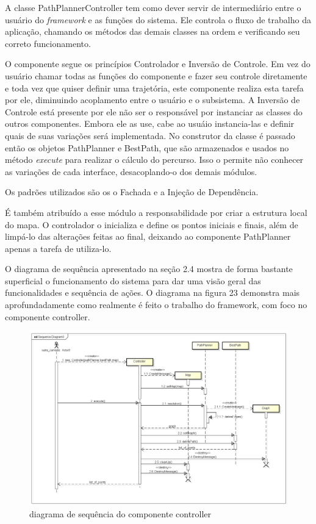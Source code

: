 A classe PathPlannerController tem como dever servir de intermediário entre o usuário do \textit{framework} e as funções do sistema. Ele controla o fluxo de trabalho da aplicação, chamando os métodos das demais classes na ordem e verificando seu correto funcionamento.

O componente segue os princípios Controlador e Inversão de Controle. Em vez do usuário chamar todas as funções do componente e fazer seu controle diretamente e toda vez que quiser definir uma trajetória, este componente realiza esta tarefa por ele, diminuindo acoplamento entre o usuário e o subsistema. A Inversão de Controle está presente por ele não ser o responsável por instanciar as classes do outros componentes. Embora ele as use, cabe ao usuáio instancia-las e definir quais de suas variações será implementada. No construtor da classe é passado então os objetos PathPlanner e BestPath, que são armazenados e usados no método \textit{execute} para realizar o cálculo do percurso. Isso o permite não conhecer as variações de cada interface, desacoplando-o dos demais módulos.

Os padrões utilizados são os o Fachada e a Injeção de Dependência.

É também atribuído a esse módulo a responsabilidade por criar a estrutura local do mapa. O controlador o inicializa e define os pontos iniciais e finais, além de limpá-lo das alterações feitas ao final, deixando ao componente PathPlanner apenas a tarefa de utiliza-lo.

O diagrama de sequência apresentado na seção 2.4 mostra de forma bastante superficial o funcionamento do sistema para dar uma visão geral das funcionalidades e sequência de ações. O diagrama na figura 23 demonstra mais aprofundadamente como realmente é feito o trabalho do framework, com foco no componente controller.

\begin{figure}[h]
	\centering
	\label{fig23}
		\includegraphics[keepaspectratio=true,scale=0.4]{figuras/executeController.png}
	\caption{diagrama de sequência do componente controller}
\end{figure}

